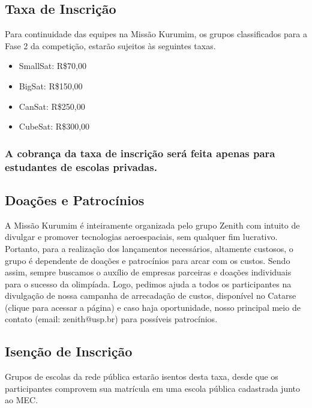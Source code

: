     \subsection{Taxa de Inscrição}\label{sec: taxa}

        \par Para continuidade das equipes na Missão Kurumim, os grupos classificados 
        para a Fase 2 da competição, estarão sujeitos às seguintes taxas.

        \begin{itemize}
            \item SmallSat: R\$70,00
            \item BigSat: R\$150,00
            \item CanSat: R\$250,00
            \item CubeSat: R\$300,00
        \end{itemize}

        \subsubsection{A cobrança da taxa de inscrição será feita apenas para estudantes 
        de escolas privadas.}\label{sec:taxa_privada}

    \subsection{Doações e Patrocínios}\label{sec:doacoes}
        \par A Missão Kurumim é inteiramente organizada pelo grupo Zenith com intuito de 
        divulgar e promover tecnologias aeroespaciais, sem qualquer fim lucrativo. Portanto,
        para a realização dos lançamentos necessários, altamente custosos, o grupo é dependente
        de doações e patrocínios para arcar com os custos. Sendo assim, sempre buscamos o auxílio 
        de empresas parceiras e doações individuais para o sucesso da olimpíada. Logo, pedimos ajuda 
        a todos os participantes na divulgação de nossa campanha de arrecadação de custos, disponível 
        no Catarse (clique para acessar a página) e caso haja oportunidade, nosso principal meio de 
        contato (email: zenith@usp.br) para possíveis patrocínios.

    \subsection{Isenção de Inscrição}\label{sec:isencao}
        \par Grupos de escolas da rede pública estarão isentos desta taxa, desde que os participantes 
        comprovem sua matrícula em uma escola pública cadastrada junto ao MEC.

